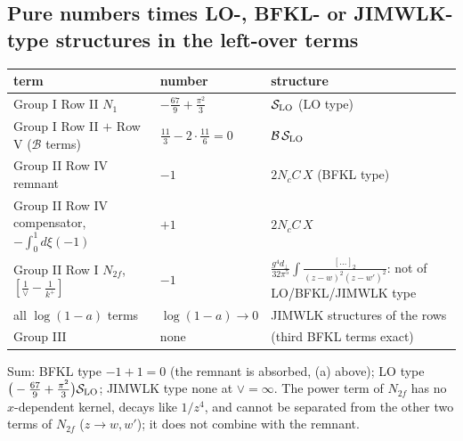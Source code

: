 \documentclass[9pt]{article}
\numberwithin{equation}{section}
\begin{document}
\subsection{Pure numbers times LO-, BFKL- or JIMWLK-type structures in the left-over terms}
\begin{center}
\begin{tabular}{|l|l|l|}
\hline
term & number & structure \\ \hline
Group I Row II $N_{1}$ & $-\frac{67}{9}+\frac{\pi^{2}}{3}$ & $\mathcal S_{\rm LO}$ (LO type) \\
Group I Row II $+$ Row V ($\mathcal B$ terms) & $\frac{11}{3}-2\cdot\frac{11}{6}=0$ & $\mathcal B\,\mathcal S_{\rm LO}$ \\
Group II Row IV remnant & $-1$ & $2N_{c}C\,X$ (BFKL type) \\
Group II Row IV compensator, $-\int_{0}^{1}d\xi(-1)$ & $+1$ & $2N_{c}C\,X$ \\
Group II Row I $N_{2f}$, $[\frac1\vee-\frac{1}{k^{+}}]$ & $-1$ & $\frac{g^{4}d_{\perp}}{32\pi^{5}}\int\frac{[\dots]_{2}}{(z-w)^{2}(z-w')^{2}}$: not of LO/BFKL/JIMWLK type \\
all $\log(1-a)$ terms & $\log(1-a)\to0$ & JIMWLK structures of the rows \\
Group III & none & (third BFKL terms exact) \\ \hline
\end{tabular}
\end{center}
Sum: BFKL type $-1+1=0$ (the remnant is absorbed, (a) above); LO type $\big(-\frac{67}{9}+\frac{\pi^{2}}{3}\big)\mathcal S_{\rm LO}$; JIMWLK type none at $\vee=\infty$. The power term of $N_{2f}$ has no $x$-dependent kernel, decays like $1/z^{4}$, and cannot be separated from the other two terms of $N_{2f}$ ($z\to w,w'$); it does not combine with the remnant.
\end{document}
